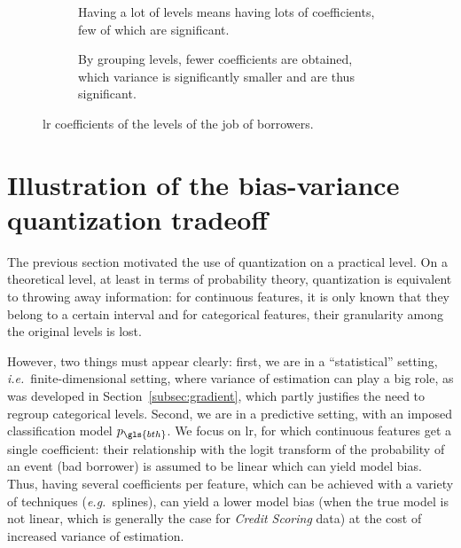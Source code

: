 \begin{figure}[!ht]
\begin{subfigure}[t]{0.5\textwidth}
\centering \resizebox{\textwidth}{!}{}
\caption{Having a lot of levels means having lots of coefficients, few of which are significant.}
\label{fig:csp_estim}
\end{subfigure}
\begin{subfigure}[t]{0.5\textwidth}
\centering \resizebox{\textwidth}{!}{}
\caption{By grouping levels, fewer coefficients are obtained, which variance is significantly smaller and are thus significant.}
\label{fig:csp_estim_disc}
\end{subfigure}
\caption{\gls{lr} coefficients of the levels of the job of borrowers.}
\label{fig:csp}
\end{figure}

\section{Illustration of the bias-variance quantization tradeoff} \label{sec:bias_variance_quant}
 

The previous section motivated the use of quantization on a practical level. On a theoretical level, at least in terms of probability theory, quantization is equivalent to throwing away information: for continuous features, it is only known that they belong to a certain interval and for categorical features, their granularity among the original levels is lost.

However, two things must appear clearly: first, we are in a ``statistical'' setting, \textit{i.e.}\ finite-dimensional setting, where variance of estimation can play a big role, as was developed in Section~\ref{subsec:gradient}, which partly justifies the need to regroup categorical levels. Second, we are in a predictive setting, with an imposed classification model $p_{\gls{bth}}$. We focus on \gls{lr}, for which continuous features get a single coefficient: their relationship with the logit transform of the probability of an event (bad borrower) is assumed to be linear which can yield model bias. Thus, having several coefficients per feature, which can be achieved with a  variety of techniques (\textit{e.g.}\ splines), can yield a lower model bias (when the true model is not linear, which is generally the case for \textit{Credit Scoring} data) at the cost of increased variance of estimation.


